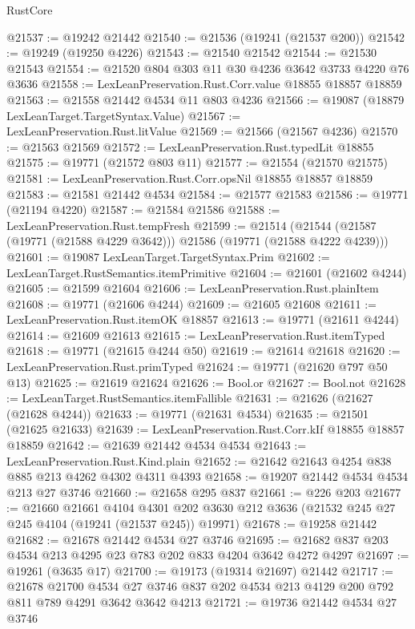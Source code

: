 \begin{lexlean}{RustCore}
\begin{coremodule}
@21537 := @19242 @21442
@21540 := @21536 (@19241 (@21537 @200))
@21542 := @19249 (@19250 @4226)
@21543 := @21540 @21542
@21544 := @21530 @21543
@21554 := @21520 @804 @303 @11 @30 @4236 @3642 @3733 @4220 @76 @3636
@21558 := LexLeanPreservation.Rust.Corr.value @18855 @18857 @18859
@21563 := @21558 @21442 @4534 @11 @803 @4236
@21566 := @19087 (@18879 LexLeanTarget.TargetSyntax.Value)
@21567 := LexLeanPreservation.Rust.litValue
@21569 := @21566 (@21567 @4236)
@21570 := @21563 @21569
@21572 := LexLeanPreservation.Rust.typedLit @18855
@21575 := @19771 (@21572 @803 @11)
@21577 := @21554 (@21570 @21575)
@21581 := LexLeanPreservation.Rust.Corr.opsNil @18855 @18857 @18859
@21583 := @21581 @21442 @4534
@21584 := @21577 @21583
@21586 := @19771 (@21194 @4220)
@21587 := @21584 @21586
@21588 := LexLeanPreservation.Rust.tempFresh
@21599 := @21514
    (@21544 (@21587 (@19771 (@21588 @4229 @3642))) @21586 (@19771 (@21588 @4222 @4239)))
@21601 := @19087 LexLeanTarget.TargetSyntax.Prim
@21602 := LexLeanTarget.RustSemantics.itemPrimitive
@21604 := @21601 (@21602 @4244)
@21605 := @21599 @21604
@21606 := LexLeanPreservation.Rust.plainItem
@21608 := @19771 (@21606 @4244)
@21609 := @21605 @21608
@21611 := LexLeanPreservation.Rust.itemOK @18857
@21613 := @19771 (@21611 @4244)
@21614 := @21609 @21613
@21615 := LexLeanPreservation.Rust.itemTyped
@21618 := @19771 (@21615 @4244 @50)
@21619 := @21614 @21618
@21620 := LexLeanPreservation.Rust.primTyped
@21624 := @19771 (@21620 @797 @50 @13)
@21625 := @21619 @21624
@21626 := Bool.or
@21627 := Bool.not
@21628 := LexLeanTarget.RustSemantics.itemFallible
@21631 := @21626 (@21627 (@21628 @4244))
@21633 := @19771 (@21631 @4534)
@21635 := @21501 (@21625 @21633)
@21639 := LexLeanPreservation.Rust.Corr.kIf @18855 @18857 @18859
@21642 := @21639 @21442 @4534 @4534
@21643 := LexLeanPreservation.Rust.Kind.plain
@21652 := @21642 @21643 @4254 @838 @885 @213 @4262 @4302 @4311 @4393
@21658 := @19207 @21442 @4534 @4534 @213 @27 @3746
@21660 := @21658 @295 @837
@21661 := @226 @203
@21677 := @21660
    @21661
    @4104
    @4301
    @202
    @3630
    @212
    @3636
    (@21532 @245 @27 @245 @4104 (@19241 (@21537 @245)) @19971)
@21678 := @19258 @21442
@21682 := @21678 @21442 @4534 @27 @3746
@21695 := @21682 @837 @203 @4534 @213 @4295 @23 @783 @202 @833 @4204 @3642 @4272 @4297
@21697 := @19261 (@3635 @17)
@21700 := @19173 (@19314 @21697) @21442
@21717 := @21678
    @21700
    @4534
    @27
    @3746
    @837
    @202
    @4534
    @213
    @4129
    @200
    @792
    @811
    @789
    @4291
    @3642
    @3642
    @4213
@21721 := @19736 @21442 @4534 @27 @3746

\end{coremodule}
\end{lexlean}
